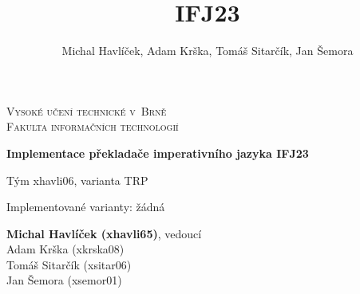 \documentclass[12pt,a4paper]{article}
\author{Michal Havlíček, Adam Krška, Tomáš Sitarčík, Jan Šemora}
\title{IFJ23}
\begin{document}
\makeatletter
\begin{titlepage}
\begin{center}
	{\Huge\textsc{Vysoké učení technické v~Brně}\\[0.4em]
	\LARGE\textsc{Fakulta informačních technologií}}


	{\bfseries\LARGE Implementace překladače imperativního jazyka IFJ23}

	\vspace{1cm}

	{\LARGE Tým xhavli06, varianta TRP}
	\vspace{1cm}

	{\large Implementované varianty: žádná}

	{
		\large
		\textbf{Michal Havlíček (xhavli65)}, vedoucí\\
		Adam Krška (xkrska08)\\
		Tomáš Sitarčík (xsitar06)\\
		Jan Šemora (xsemor01)
	}
\end{center}
\end{titlepage}
\makeatother

\tableofcontents



\end{document}
